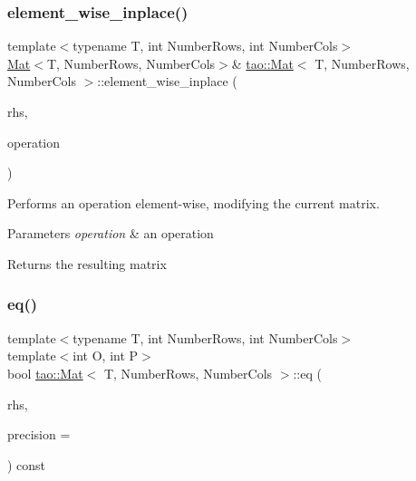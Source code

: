 \subsubsection{\texorpdfstring{element\_wise\_inplace()}{element\_wise\_inplace()}}
{\footnotesize\ttfamily template$<$typename T, int Number\+Rows, int Number\+Cols$>$ \\
\mbox{\hyperlink{classtao_1_1_mat}{Mat}}$<$T, Number\+Rows, Number\+Cols$>$\& \mbox{\hyperlink{classtao_1_1_mat}{tao\+::\+Mat}}$<$ T, Number\+Rows, Number\+Cols $>$\+::element\+\_\+wise\+\_\+inplace (\begin{DoxyParamCaption}\item[{const \mbox{\hyperlink{classtao_1_1_mat}{Mat}}$<$ T, Number\+Rows, Number\+Cols $>$ \&}]{rhs,  }\item[{std\+::function$<$ T(T, T)$>$}]{operation }\end{DoxyParamCaption})\hspace{0.3cm}{\ttfamily [inline]}}



Performs an operation element-\/wise, modifying the current matrix. 


\begin{DoxyParams}{Parameters}
{\em operation} & an operation \\
\hline
\end{DoxyParams}
\begin{DoxyReturn}{Returns}
the resulting matrix 
\end{DoxyReturn}
\mbox{\label{classtao_1_1_mat_a109f651508ab5ff613c7b11cefedd263}} 
\subsubsection{\texorpdfstring{eq()}{eq()}}
{\footnotesize\ttfamily template$<$typename T, int Number\+Rows, int Number\+Cols$>$ \\
template$<$int O, int P$>$ \\
bool \mbox{\hyperlink{classtao_1_1_mat}{tao\+::\+Mat}}$<$ T, Number\+Rows, Number\+Cols $>$\+::eq (\begin{DoxyParamCaption}\item[{const \mbox{\hyperlink{classtao_1_1_mat}{Mat}}$<$ T, O, P $>$ \&}]{rhs,  }\item[{float}]{precision = {} }\end{DoxyParamCaption}) const\hspace{0.3cm}{\ttfamily [inline]}}



